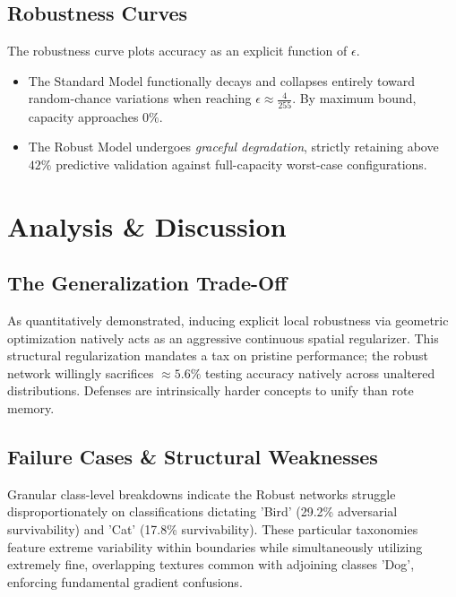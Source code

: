 \documentclass[12pt,a4paper]{article}
\begin{document}
\subsection{Robustness Curves}
The robustness curve plots accuracy as an explicit function of $\epsilon$.
\begin{itemize}
    \item The Standard Model functionally decays and collapses entirely toward random-chance variations when reaching $\epsilon \approx \frac{4}{255}$. By maximum bound, capacity approaches $0\%$.
    \item The Robust Model undergoes \textit{graceful degradation}, strictly retaining above $42\%$ predictive validation against full-capacity worst-case configurations.
\end{itemize}

\section{Analysis \& Discussion}

\subsection{The Generalization Trade-Off}
As quantitatively demonstrated, inducing explicit local robustness via geometric optimization natively acts as an aggressive continuous spatial regularizer. This structural regularization mandates a tax on pristine performance; the robust network willingly sacrifices $\approx 5.6\%$ testing accuracy natively across unaltered distributions. Defenses are intrinsically harder concepts to unify than rote memory. 

\subsection{Failure Cases \& Structural Weaknesses}
Granular class-level breakdowns indicate the Robust networks struggle disproportionately on classifications dictating 'Bird' (29.2\% adversarial survivability) and 'Cat' (17.8\% survivability). These particular taxonomies feature extreme variability within boundaries while simultaneously utilizing extremely fine, overlapping textures common with adjoining classes 'Dog', enforcing fundamental gradient confusions.
\end{document}
